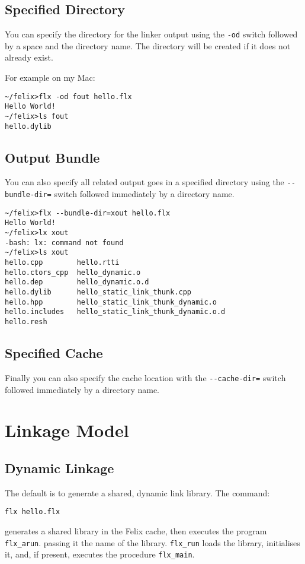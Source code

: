 \documentclass[oneside]{book}
\begin{document}
\subsection{Specified Directory}
You can specify the directory for the linker output
using the \verb$-od$ switch followed by a space and the
directory name. The directory will be created if it does
not already exist.

For example on my Mac:
\begin{verbatim}
~/felix>flx -od fout hello.flx
Hello World!
~/felix>ls fout
hello.dylib
\end{verbatim}

\subsection{Output Bundle}
You can also specify all related output goes
in a specified directory using the \verb$--bundle-dir=$ switch
followed immediately by a directory name.

\begin{verbatim}
~/felix>flx --bundle-dir=xout hello.flx
Hello World!
~/felix>lx xout
-bash: lx: command not found
~/felix>ls xout
hello.cpp        hello.rtti
hello.ctors_cpp  hello_dynamic.o
hello.dep        hello_dynamic.o.d
hello.dylib      hello_static_link_thunk.cpp
hello.hpp        hello_static_link_thunk_dynamic.o
hello.includes   hello_static_link_thunk_dynamic.o.d
hello.resh
\end{verbatim}

\subsection{Specified Cache}
Finally you can also specify the cache location with the
\verb$--cache-dir=$ switch followed immediately by a
directory name. 

\section{Linkage Model}
\subsection{Dynamic Linkage}
The default is to generate a shared, dynamic link library.
The command:
\begin{verbatim}
flx hello.flx
\end{verbatim}
generates a shared library in the Felix cache, then executes the
program \verb$flx_arun$. passing it the name of the library.
\verb$flx_run$ loads the library, initialises it, and, if present,
executes the procedure \verb$flx_main$.
\end{document}
